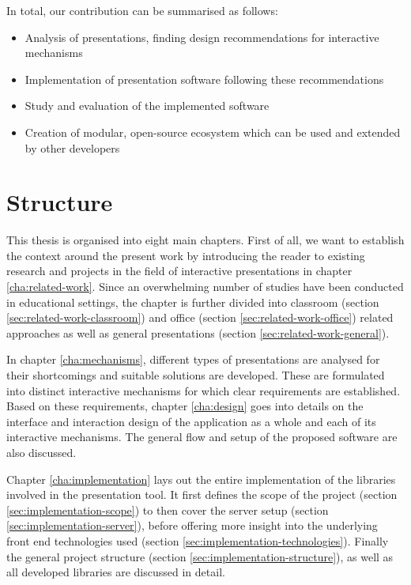 In total, our contribution can be summarised as follows:
\begin{itemize}
\item Analysis of presentations, finding design recommendations for interactive mechanisms
\item Implementation of presentation software following these recommendations
\item Study and evaluation of the implemented software
\item Creation of modular, open-source ecosystem which can  be used and extended by other developers
\end{itemize}

\section{Structure}

This thesis is organised into eight main chapters. First of all, we want to establish the context around the present work by introducing the reader to existing research and projects in the field of interactive presentations in chapter \ref{cha:related-work}. Since an overwhelming number of studies have been conducted in educational settings, the chapter is further divided into classroom (section \ref{sec:related-work-classroom}) and office (section \ref{sec:related-work-office}) related approaches as well as general presentations (section \ref{sec:related-work-general}).

In chapter \ref{cha:mechanisms}, different types of presentations are analysed for their shortcomings and suitable solutions are developed. These are formulated into distinct interactive mechanisms for which clear requirements are established.
Based on these requirements, chapter \ref{cha:design} goes into details on the interface and interaction design of the application as a whole and each of its interactive mechanisms. The general flow and setup of the proposed software are also discussed.

Chapter \ref{cha:implementation} lays out the entire implementation of the libraries involved in the presentation tool. It first defines the scope of the project (section \ref{sec:implementation-scope}) to then cover the server setup (section \ref{sec:implementation-server}), before offering more insight into the underlying front end technologies used (section \ref{sec:implementation-technologies}). Finally the general project structure (section \ref{sec:implementation-structure}), as well as all developed libraries are discussed in detail.

